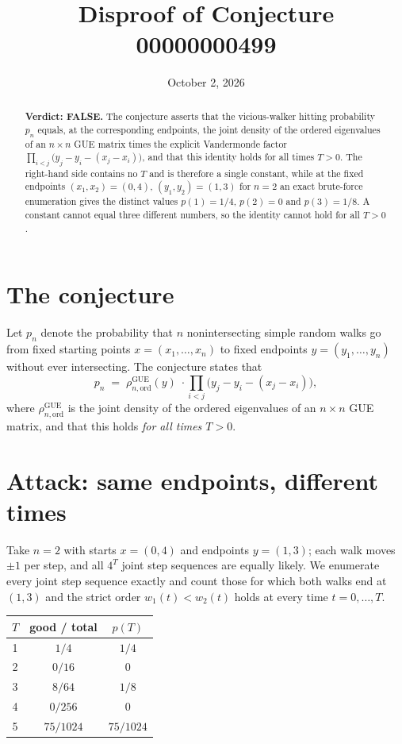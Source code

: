 \documentclass[11pt]{article}
\begin{document}
\title{Disproof of Conjecture 00000000499}
\author{}
\date{October 2, 2026}
\maketitle

\begin{abstract}
\noindent\textbf{Verdict: FALSE.} The conjecture asserts that the vicious-walker
hitting probability $p_n$ equals, at the corresponding endpoints, the joint density
of the ordered eigenvalues of an $n\times n$ GUE matrix times the explicit
Vandermonde factor $\prod_{i<j}\bigl(y_j-y_i-(x_j-x_i)\bigr)$, and that this
identity holds for all times $T>0$. The right-hand side contains no $T$ and is
therefore a single constant, while at the fixed endpoints $(x_1,x_2)=(0,4)$,
$(y_1,y_2)=(1,3)$ for $n=2$ an exact brute-force enumeration gives the distinct
values $p(1)=1/4$, $p(2)=0$ and $p(3)=1/8$. A constant cannot equal three different
numbers, so the identity cannot hold for all $T>0$.
\end{abstract}

\section{The conjecture}

Let $p_n$ denote the probability that $n$ nonintersecting simple random walks go
from fixed starting points $x=(x_1,\dots,x_n)$ to fixed endpoints
$y=(y_1,\dots,y_n)$ without ever intersecting. The conjecture states that
\[
p_n \;=\; \rho^{\mathrm{GUE}}_{n,\mathrm{ord}}(y)\;\cdot\!\!\prod_{i<j}\bigl(y_j-y_i-(x_j-x_i)\bigr),
\]
where $\rho^{\mathrm{GUE}}_{n,\mathrm{ord}}$ is the joint density of the ordered
eigenvalues of an $n\times n$ GUE matrix, and that this holds \emph{for all times
$T>0$}.

\section{Attack: same endpoints, different times}

Take $n=2$ with starts $x=(0,4)$ and endpoints $y=(1,3)$; each walk moves
$\pm1$ per step, and all $4^T$ joint step sequences are equally likely. We
enumerate every joint step sequence exactly and count those for which both walks
end at $(1,3)$ and the strict order $w_1(t)<w_2(t)$ holds at every time
$t=0,\dots,T$.

\begin{center}
\begin{tabular}{c c c}
\hline
$T$ & good / total & $p(T)$\\
\hline
1 & $1/4$      & $1/4$\\
2 & $0/16$     & $0$\\
3 & $8/64$     & $1/8$\\
4 & $0/256$    & $0$\\
5 & $75/1024$  & $75/1024$\\
\hline
\end{tabular}
\end{center}
\end{document}

